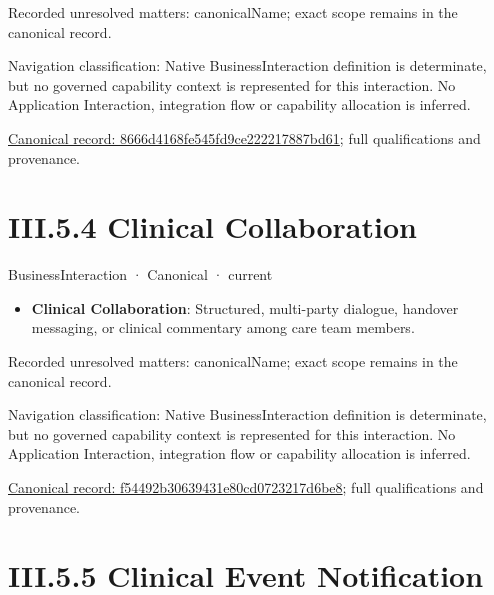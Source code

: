 {\small Recorded unresolved matters: canonicalName; exact scope remains in the canonical record.}\par
{\small Navigation classification: Native BusinessInteraction definition is determinate, but no governed capability context is represented for this interaction. No Application Interaction, integration flow or capability allocation is inferred.}\par
{\footnotesize \href{../../../../../../../../continuum/business/business-interaction/8666d4168fe545fd9ce222217887bd61.md}{Canonical record: 8666d4168fe545fd9ce222217887bd61}; full qualifications and provenance.}\par
\section*{III.5.4 Clinical Collaboration}
\label{navigation:III.5.4}

\label{element:f54492b30639431e80cd0723217d6be8}
{\small BusinessInteraction · Canonical · current}\par

\begin{itemize}


\item \textbf{Clinical Collaboration}: Structured, multi-party dialogue, handover messaging, or clinical commentary among care team members.

\end{itemize}

{\small Recorded unresolved matters: canonicalName; exact scope remains in the canonical record.}\par
{\small Navigation classification: Native BusinessInteraction definition is determinate, but no governed capability context is represented for this interaction. No Application Interaction, integration flow or capability allocation is inferred.}\par
{\footnotesize \href{../../../../../../../../continuum/business/business-interaction/f54492b30639431e80cd0723217d6be8.md}{Canonical record: f54492b30639431e80cd0723217d6be8}; full qualifications and provenance.}\par
\section*{III.5.5 Clinical Event Notification}
\label{navigation:III.5.5}

